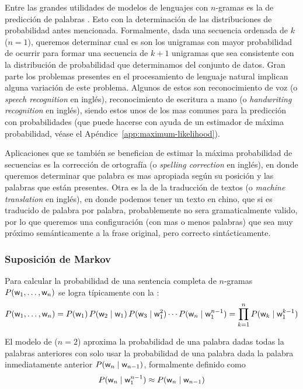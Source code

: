 Entre las grandes utilidades de modelos de lenguajes con $n$-gramas es la de predicción de palabras \cite{jurafsky-martin}. Esto con la determinación de las distribuciones de probabilidad antes mencionada. Formalmente, dada una secuencia ordenada de $k$  ($n=1$), queremos determinar cual es son los unigramas con mayor probabilidad de ocurrir para formar una secuencia de $k+1$ unigramas que sea consistente con la distribución de probabilidad que determinamos del conjunto de datos. Gran parte los problemas presentes en el procesamiento de lenguaje natural implican alguna variación de este problema. Algunos de estos son reconocimiento de voz (o \textsl{speech recognition} en inglés), reconocimiento de escritura a mano (o \textsl{handwriting recognition} en inglés), siendo estos unos de los mas comunes para la predicción con probabilidades (que puede hacerse con ayuda de un estimador de máxima probabilidad, véase el Apéndice~\ref{app:maximum-likelihood}).

Aplicaciones que se también se benefician de estimar la máxima probabilidad de secuencias es la corrección de ortografía (o \textsl{spelling correction} en inglés), en donde queremos determinar que palabra es mas apropiada según su posición y las palabras que están presentes. Otra es la de la traducción de textos (o \textsl{machine translation} en inglés), en donde podemos tener un texto en chino, que si es traducido de palabra por palabra, probablemente no sera gramaticalmente valido, por lo que queremos una configuración (con mas o menos palabras) que sea muy próximo semánticamente a la frase original, pero correcto sintácticamente.

\subsubsection{Suposición de Markov}
Para calcular la probabilidad de una sentencia completa de $n$-gramas $P({\mathit{\mathsf{w}}}_1, \ldots, {\mathit{\mathsf{w}}}_n)$ se logra típicamente con la :
\begin{equation}
  P({\mathit{\mathsf{w}}}_1, \ldots, {\mathit{\mathsf{w}}}_n) = P({\mathit{\mathsf{w}}}_1)\, P({\mathit{\mathsf{w}}}_2 \mid {\mathit{\mathsf{w}}}_1)\, P({\mathit{\mathsf{w}}}_3 \mid {\mathit{\mathsf{w}}}_1^2) \cdots P({\mathit{\mathsf{w}}}_n \mid {\mathit{\mathsf{w}}}_1^{n-1}) = \prod_{k=1}^{n} P({\mathit{\mathsf{w}}}_k \mid {\mathit{\mathsf{w}}}_1^{k-1})
\end{equation}

El modelo de  ($n=2$) aproxima la probabilidad de una palabra dadas todas la palabras anteriores  con solo usar la probabilidad de una palabra dada la palabra inmediatamente anterior $P({\mathit{\mathsf{w}}}_n \mid {\mathit{\mathsf{w}}}_{n-1})$, formalmente definido como
\begin{equation} \label{eq:markov-assumption-bigram}
  P({\mathit{\mathsf{w}}}_n \mid {\mathit{\mathsf{w}}}_1^{n-1}) \approx P({\mathit{\mathsf{w}}}_n \mid {\mathit{\mathsf{w}}}_{n-1})
\end{equation}


